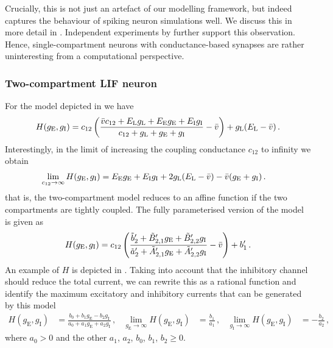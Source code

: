 Crucially, this is not just an artefact of our modelling framework, but indeed captures the behaviour of spiking neuron simulations well.
We discuss this in more detail in \citet{stockel2017point}.
Independent experiments by \citet{kiselev2020approximating} further support this observation.
Hence, single-compartment \LIF neurons with conductance-based synapses are rather uninteresting from a computational perspective.

\subsubsection{Two-compartment LIF neuron}
For the model depicted in  we have
\begin{align}
	H(g_\mathrm{E}, g_\mathrm{I}) = c_{12} \left(\frac{{{\bar v}} c_\mathrm{12} + E_\mathrm{L} g_\mathrm{L} + E_\mathrm{E} g_\mathrm{E} + E_\mathrm{I} g_\mathrm{I}}{c_\mathrm{12} + g_\mathrm{L} + g_\mathrm{E} + g_\mathrm{I}} - {{\bar v}} \right) + g_\mathrm{L}(E_\mathrm{L} - {{\bar v}}) \,.
	\label{eqn:two_comp_lif_natural}
\end{align}
Interestingly, in the limit of increasing the coupling conductance $c_{12}$ to infinity we obtain
\begin{align*}
	\lim_{c_{12} \to \infty} H(g_\mathrm{E}, g_\mathrm{I}) &= 
		E_\mathrm{E} g_\mathrm{E} + E_\mathrm{I} g_\mathrm{I} + 2 g_\mathrm{L} (E_\mathrm{L} - {{\bar v}}) - {{\bar v}} (g_\mathrm{E} + g_\mathrm{I}) \,.
\end{align*}
that is, the two-compartment model reduces to an affine function if the two compartments are tightly coupled.
The fully parameterised version of the model is given as
\begin{align*}
	H(g_\mathrm{E}, g_\mathrm{I}) =
		c_{12} \left(\frac{
			\tilde b'_2 + \tilde B'_{2, 1} g_\mathrm{E} + \tilde B'_{2, 2} g_\mathrm{I}
		}{
			\tilde a'_2 + \tilde A'_{2, 1} g_\mathrm{E} + \tilde A'_{2, 2} g_\mathrm{I}
		} - {{\bar v}} \right) + b'_1 \,.
\end{align*}
An example of $H$ is depicted in .
Taking into account that the inhibitory channel should reduce the total current, we can rewrite this as a rational function and identify the maximum excitatory and inhibitory currents that can be generated by this model
\begin{align}
	H(g_\mathrm{E}, g_\mathrm{I}) &=
		\frac{
	        b_0 + b_1 g_\mathrm{E} - b_2 g_\mathrm{I}
        }{
	        a_0 + a_1 g_\mathrm{E} + a_2 g_\mathrm{I}
        } \,,
	& \lim_{g_\mathrm{E} \to \infty} H(g_\mathrm{E}, g_\mathrm{I}) &= \frac{b_1}{a_1} \,,
	& \lim_{g_\mathrm{I} \to \infty} H(g_\mathrm{E}, g_\mathrm{I}) &= -\frac{b_2}{a_2} \,,
	\label{eqn:two_comp_lif}
\end{align}
where $a_0 > 0$ and the other $a_1$, $a_2$, $b_0$, $b_1$, $b_2 \geq 0$.

